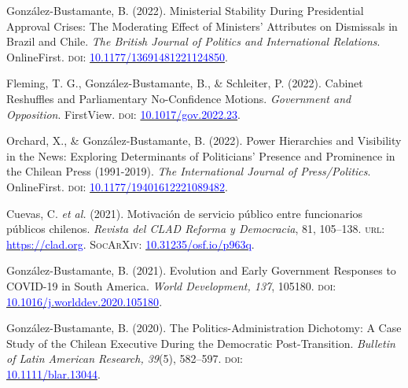 \begin{publications}

\begin{benumerate}{9}

\item{González-Bustamante, B. (2022). Ministerial Stability During Presidential Approval Crises: The Moderating Effect of Ministers' Attributes on Dismissals in Brazil and Chile. {\itshape The British Journal of Politics and International Relations}. OnlineFirst. {\scshape doi:} \href{https://doi.org/10.1177/13691481221124850}{\textcolor{blue}{10.1177/13691481221124850}}.}\vspace{1mm}

\item{Fleming, T. G., González-Bustamante, B., \& Schleiter, P. (2022). Cabinet Reshuffles and Parliamentary No-Confidence Motions. {\itshape Government and Opposition}. FirstView. {\scshape doi:} \href{https://doi.org/10.1017/gov.2022.23}{\textcolor{blue}{10.1017/gov.2022.23}}.}\vspace{1mm}

\item{Orchard, X., \& González-Bustamante, B. (2022). Power Hierarchies and Visibility in the News: Exploring Determinants of Politicians’ Presence and Prominence in the Chilean Press (1991-2019). {\itshape The International Journal of Press/Politics}. OnlineFirst. {\scshape doi:} \href{https://doi.org/10.1177/19401612221089482}{\textcolor{blue}{10.1177/19401612221089482}}.}

\item{\small Cuevas, C. {\itshape et al.} (2021). Motivación de servicio público entre funcionarios públicos chilenos. {\itshape Revista del CLAD Reforma y Democracia}, 81, 105--138. {\scshape url:} \href{https://clad.org/documentacion/revista-clad/articulos-publicados/081-noviembre-2021/}{\textcolor{blue}{https://clad.org}}. {\scshape \footnotesize SocArXiv:} \href{https://doi.org/10.31235/osf.io/p963q}{\textcolor{blue}{10.31235/osf.io/p963q}}.}\vspace{1mm}

\item{\small González-Bustamante, B. (2021). Evolution and Early Government Responses to COVID-19 in South America. {\itshape World Development, 137}, 105180. {\scshape doi:} \href{https://doi.org/10.1016/j.worlddev.2020.105180}{\textcolor{blue}{10.1016/j.worlddev.2020.105180}}.}\vspace{1mm}

\item{\small González-Bustamante, B. (2020). The Politics-Administration Dichotomy: A Case Study of the Chilean Executive During the Democratic Post-Transition. {\itshape Bulletin of Latin American Research, 39}(5), 582--597. {\scshape doi}: \\ \href{https://doi.org/10.1111/blar.13044}{\textcolor{blue}{10.1111/blar.13044}}.}\vspace{1mm}


\end{benumerate}
\end{publications}
